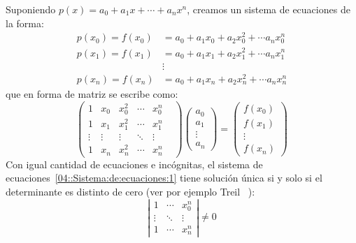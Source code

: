   Suponiendo \(p(x) = a_0 + a_1 x + \dotsb + a_n x^n\),
  creamos un sistema de ecuaciones de la forma:
  \begin{align*}
    p(x_0)
       = f(x_0)
      &= a_0 + a_1 x_0 + a_2 x_0^2 + \dotsb a_n x_0^n \\
    p(x_1)
       = f(x_1)
      &= a_0 + a_1 x_1 + a_2 x_1^2 + \dotsb a_n x_1^n \\
      &\vdots \\
    p(x_n)
       = f(x_n)
      &= a_0 + a_1 x_n + a_2 x_n^2 + \dotsb a_n x_n^n
  \end{align*}
  que en forma de matriz se escribe como:
  \begin{equation}
    \label{04::Sistema:de:ecuaciones:1}
    \begin{pmatrix}
      1 & x_0 & x_0^2 & \cdots & x_0^n \\
      1 & x_1 & x_1^2 & \cdots & x_1^n \\
      \vdots & \vdots & \vdots & \ddots & \vdots & \\
      1 & x_n & x_n^2 & \cdots & x_n^n
    \end{pmatrix}
    \begin{pmatrix}
      a_0 \\
      a_1 \\
      \vdots \\
      a_n
    \end{pmatrix} =
    \begin{pmatrix}
      f(x_0) \\
      f(x_1) \\
      \vdots \\
      f(x_n)
    \end{pmatrix}
  \end{equation}
  Con igual cantidad de ecuaciones e incógnitas,
  el sistema de ecuaciones~\eqref{04::Sistema:de:ecuaciones:1}
  tiene solución única si y solo si
  el determinante es distinto de cero
  (ver por ejemplo Treil~%
    \cite{treil17:_linear_algeb_done_wrong}):
  \begin{equation}
    \label{04::Determinante:de:Vandermonde = 0}
    \left\lvert
      \begin{matrix}
        1 & \cdots & x_0^n\\
        \vdots & \ddots & \vdots \\
        1 & \cdots & x_n^n
      \end{matrix}
    \right\rvert
      \ne 0
  \end{equation}

